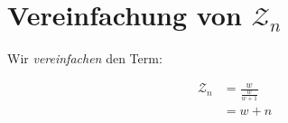 \documentclass{article}
\begin{document}
\section{Vereinfachung von \(\mathcal{Z}_n\)}

Wir \textit{vereinfachen} den Term:

\begin{align}
	\mathcal{Z}_n &= \frac{w}{ \frac{w}{w+1} } \\
	              &= w+n
\end{align}
\end{document}
